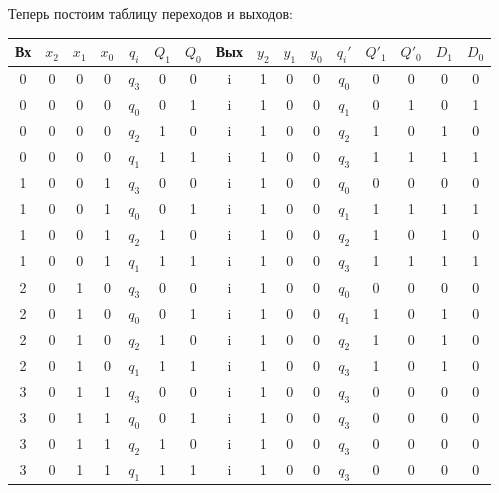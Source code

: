 Теперь постоим таблицу переходов и выходов:
\begin{table}[H]
\centering
\begin{tabularx}{\textwidth}{|C|CCC|C|CC|C|CCC|C|CC|CC|}
    \hline
    \small{Вх} & $x_2$ & $x_1$ & $x_0$ & $q_i$ & $Q_1$ & $Q_0$ & \small{Вых} & $y_2$ & $y_1$ & $y_0$ & $q_i'$ & $Q'_1$ & $Q'_0$
                    & $D_1$ & $D_0$ \\
      & 0 & 0 & 0   &   $q_3$ & 0 & 0   &   i & 1 & 0 & 0   &  $q_0$ & 0 & 0   &   0 & 0   \\
    0  & 0 & 0 & 0   &   $q_0$ & 0 & 1   &   i & 1 & 0 & 0   &  $q_1$ & 0 & 1   &   0 & 1   \\
    0  & 0 & 0 & 0   &   $q_2$ & 1 & 0   &   i & 1 & 0 & 0   &  $q_2$ & 1 & 0   &   1 & 0   \\
    0  & 0 & 0 & 0   &   $q_1$ & 1 & 1   &   i & 1 & 0 & 0   &  $q_3$ & 1 & 1   &   1 & 1   \\
      & 0 & 0 & 1   &   $q_3$ & 0 & 0   &   i & 1 & 0 & 0   &  $q_0$ & 0 & 0   &   0 & 0   \\
    1  & 0 & 0 & 1   &   $q_0$ & 0 & 1   &   i & 1 & 0 & 0   &  $q_1$ & 1 & 1   &   1 & 1   \\
    1  & 0 & 0 & 1   &   $q_2$ & 1 & 0   &   i & 1 & 0 & 0   &  $q_2$ & 1 & 0   &   1 & 0   \\
    1  & 0 & 0 & 1   &   $q_1$ & 1 & 1   &   i & 1 & 0 & 0   &  $q_3$ & 1 & 1   &   1 & 1   \\
      & 0 & 1 & 0   &   $q_3$ & 0 & 0   &   i & 1 & 0 & 0   &  $q_0$ & 0 & 0   &   0 & 0   \\
    2  & 0 & 1 & 0   &   $q_0$ & 0 & 1   &   i & 1 & 0 & 0   &  $q_1$ & 1 & 0   &   1 & 0   \\
    2  & 0 & 1 & 0   &   $q_2$ & 1 & 0   &   i & 1 & 0 & 0   &  $q_2$ & 1 & 0   &   1 & 0   \\
    2  & 0 & 1 & 0   &   $q_1$ & 1 & 1   &   i & 1 & 0 & 0   &  $q_3$ & 1 & 0   &   1 & 0   \\
      & 0 & 1 & 1   &   $q_3$ & 0 & 0   &   i & 1 & 0 & 0   &  $q_3$ & 0 & 0   &   0 & 0   \\
    3  & 0 & 1 & 1   &   $q_0$ & 0 & 1   &   i & 1 & 0 & 0   &  $q_3$ & 0 & 0   &   0 & 0   \\
    3  & 0 & 1 & 1   &   $q_2$ & 1 & 0   &   i & 1 & 0 & 0   &  $q_3$ & 0 & 0   &   0 & 0   \\
    3  & 0 & 1 & 1   &   $q_1$ & 1 & 1   &   i & 1 & 0 & 0   &  $q_3$ & 0 & 0   &   0 & 0   \\

\end{tabularx}
\end{table}

